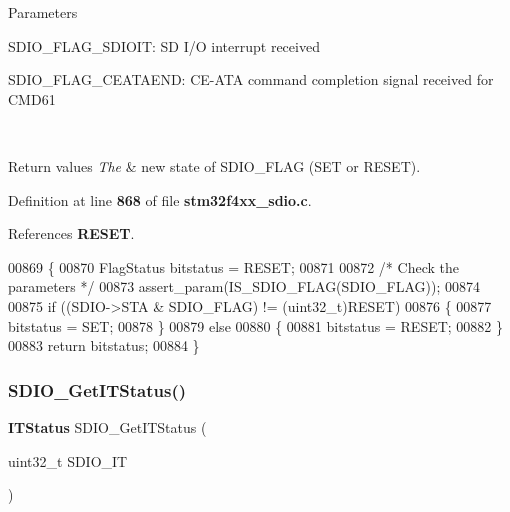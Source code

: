 \begin{DoxyParams}{Parameters}
\begin{DoxyItemize}
\item S\+D\+I\+O\+\_\+\+F\+L\+A\+G\+\_\+\+S\+D\+I\+O\+IT\+: SD I/O interrupt received \item S\+D\+I\+O\+\_\+\+F\+L\+A\+G\+\_\+\+C\+E\+A\+T\+A\+E\+ND\+: C\+E-\/\+A\+TA command completion signal received for C\+M\+D61 \end{DoxyItemize}
\\
\hline
\end{DoxyParams}

\begin{DoxyRetVals}{Return values}
{\em The} & new state of S\+D\+I\+O\+\_\+\+F\+L\+AG (S\+ET or R\+E\+S\+ET). \\
\hline
\end{DoxyRetVals}


Definition at line \textbf{ 868} of file \textbf{ stm32f4xx\+\_\+sdio.\+c}.



References \textbf{ R\+E\+S\+ET}.


\begin{DoxyCode}
00869 \{ 
00870   FlagStatus bitstatus = RESET;
00871   
00872   \textcolor{comment}{/* Check the parameters */}
00873   assert_param(IS_SDIO_FLAG(SDIO\_FLAG));
00874   
00875   \textcolor{keywordflow}{if} ((SDIO->STA & SDIO\_FLAG) != (uint32\_t)RESET)
00876   \{
00877     bitstatus = SET;
00878   \}
00879   \textcolor{keywordflow}{else}
00880   \{
00881     bitstatus = RESET;
00882   \}
00883   \textcolor{keywordflow}{return} bitstatus;
00884 \}
\end{DoxyCode}
\mbox{\label{group__SDIO__Group7_ga2d64af1f3df0f99cb518f9a89bbd02ac}} 
\subsubsection{S\+D\+I\+O\+\_\+\+Get\+I\+T\+Status()}
{\footnotesize\ttfamily \textbf{ I\+T\+Status} S\+D\+I\+O\+\_\+\+Get\+I\+T\+Status (\begin{DoxyParamCaption}\item[{uint32\+\_\+t}]{S\+D\+I\+O\+\_\+\+IT }\end{DoxyParamCaption})}



